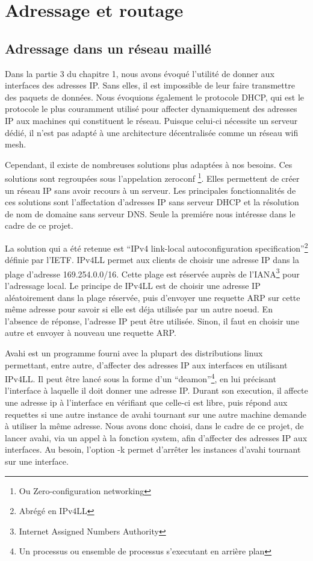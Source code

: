 \chapter{Adressage et routage}
\section{Adressage dans un réseau maillé}

Dans la partie 3 du chapitre 1, nous avons évoqué l'utilité de donner aux interfaces des adresses IP. Sans elles, il est
impossible de leur faire transmettre des paquets de données. Nous évoquions également le protocole DHCP, qui est le protocole le plus
couramment utilisé pour affecter dynamiquement des adresses IP aux machines qui constituent le réseau. Puisque celui-ci nécessite un
serveur dédié, il n'est pas adapté à une architecture décentralisée comme un réseau wifi mesh.

Cependant, il existe de nombreuses solutions plus adaptées à nos besoins. Ces solutions sont regroupées sous l'appelation zeroconf
\footnote{Ou Zero-configuration networking}. Elles permettent de créer un réseau IP sans avoir recours à un serveur.
Les principales fonctionnalités de ces solutions sont l'affectation d'adresses IP sans serveur DHCP et la résolution de nom de 
domaine sans serveur DNS. Seule la premiére nous intéresse dans le cadre de ce projet.

La solution qui a été retenue  est ``IPv4 link-local autoconfiguration specification''\footnote{Abrégé en
IPv4LL} définie par l'IETF\cite{ipv4ll}. IPv4LL permet aux clients de choisir une adresse IP dans la plage d'adresse 169.254.0.0/16.
Cette plage est réservée auprès de l'IANA\footnote{Internet Assigned Numbers Authority} pour l'adressage local. Le principe de IPv4LL
est de choisir une adresse IP aléatoirement dans la plage réservée, puis d'envoyer une requette ARP sur cette même adresse pour savoir
si elle est déja utilisée par un autre noeud. En l'absence de réponse, l'adresse IP peut être utilisée. Sinon, il faut en choisir une
autre et envoyer à nouveau une requette ARP.

Avahi est un programme fourni avec la plupart des distributions linux permettant, entre autre, d'affecter des adresses IP aux
interfaces en utilisant IPv4LL. Il peut être lancé sous la forme d'un ``deamon''\footnote{Un processus ou ensemble de processus
s'executant en arrière plan}, en lui précisant l'interface à laquelle il doit donner une adresse IP. Durant son execution, il
affecte une adresse ip à l'interface en vérifiant que celle-ci est libre, puis répond aux requettes si une autre instance de avahi
tournant sur une autre machine demande à utiliser la même adresse. Nous avons donc choisi, dans le cadre de ce projet, de lancer
avahi, via un appel à la fonction system, afin d'affecter des adresses IP aux interfaces. Au besoin, l'option -k permet d'arrêter
les instances d'avahi tournant sur une interface.

